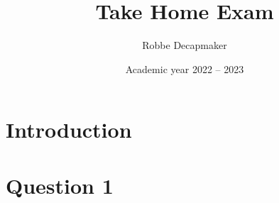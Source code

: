 \documentclass[a4paper,kul]{kulakarticle} %
\date{Academic year 2022 -- 2023}
\title{Take Home Exam}
\author{Robbe Decapmaker}
\begin{document}
	\maketitle  
	\section{Introduction}
	
	\section{Question 1}
\end{document}
